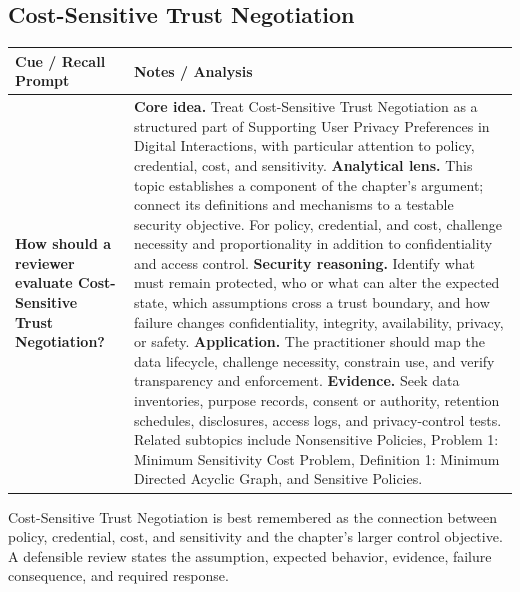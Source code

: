 \documentclass[11pt]{article}
\newcommand{\CornellHeader}{%
\rowcolor{Navy}\color{white}\bfseries Cue / Recall Prompt & \color{white}\bfseries Notes / Analysis\\\hline}
\newcommand{\CornellRow}[2]{%
\cellcolor{CueGray}\RaggedRight\textbf{#1} & \RaggedRight #2\\\hline}
\begin{document}
\subsection*{Cost-Sensitive Trust Negotiation}
\begin{longtable}{>{\RaggedRight\arraybackslash}p{}|>{\RaggedRight\arraybackslash}p{}}
\CornellHeader
\CornellRow{How should a reviewer evaluate Cost-Sensitive Trust Negotiation?}{\textbf{Core idea.} Treat Cost-Sensitive Trust Negotiation as a structured part of Supporting User Privacy Preferences in Digital Interactions, with particular attention to policy, credential, cost, and sensitivity. \textbf{Analytical lens.} This topic establishes a component of the chapter's argument; connect its definitions and mechanisms to a testable security objective. For policy, credential, and cost, challenge necessity and proportionality in addition to confidentiality and access control. \textbf{Security reasoning.} Identify what must remain protected, who or what can alter the expected state, which assumptions cross a trust boundary, and how failure changes confidentiality, integrity, availability, privacy, or safety. \textbf{Application.} The practitioner should map the data lifecycle, challenge necessity, constrain use, and verify transparency and enforcement. \textbf{Evidence.} Seek data inventories, purpose records, consent or authority, retention schedules, disclosures, access logs, and privacy-control tests. Related subtopics include Nonsensitive Policies, Problem 1: Minimum Sensitivity Cost Problem, Definition 1: Minimum Directed Acyclic Graph, and Sensitive Policies.}
\end{longtable}
\begin{topicsummary}
Cost-Sensitive Trust Negotiation is best remembered as the connection between policy, credential, cost, and sensitivity and the chapter's larger control objective. A defensible review states the assumption, expected behavior, evidence, failure consequence, and required response.
\end{topicsummary}
\end{document}
